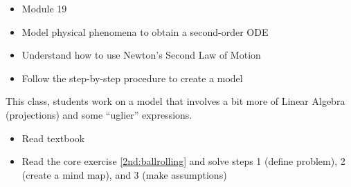 \begin{lesson}

	\begin{itemize}
		\item Module 19
	\end{itemize}
	
	\begin{itemize}
		\item Model physical phenomena to obtain a second-order ODE
		\item Understand how to use Newton's Second Law of Motion
		\item Follow the step-by-step procedure to create a model
	\end{itemize}
	

This class, students work on a model that involves a bit more of Linear Algebra (projections) and some ``uglier'' expressions.


\begin{itemize}
	\item Read textbook
	\item Read the core exercise \ref{2nd:ballrolling} and solve steps 1 (define problem), 2 (create a mind map), and 3 (make assumptions)
\end{itemize}


\end{lesson}


